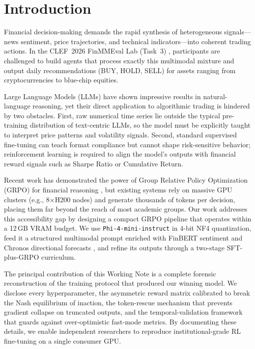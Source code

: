 \section{Introduction}
    Financial decision-making demands the rapid synthesis of heterogeneous signals---news sentiment, price trajectories, and technical indicators---into coherent trading actions. In the CLEF~2026 FinMMEval Lab (Task~3) \cite{theFinAI2025}, participants are challenged to build agents that process exactly this multimodal mixture and output daily recommendations (BUY, HOLD, SELL) for assets ranging from cryptocurrencies to blue-chip equities.

    Large Language Models (LLMs) have shown impressive results in natural-language reasoning, yet their direct application to algorithmic trading \cite{yang2023fingpt, zhang2023fingpt} is hindered by two obstacles. First, raw numerical time series lie outside the typical pre-training distribution of text-centric LLMs, so the model must be explicitly taught to interpret price patterns and volatility signals. Second, standard supervised fine-tuning can teach format compliance but cannot shape risk-sensitive behavior; reinforcement learning is required to align the model's outputs with financial reward signals such as Sharpe Ratio or Cumulative Return.

    Recent work has demonstrated the power of Group Relative Policy Optimization (GRPO) for financial reasoning \cite{xiao2025tradingr1}, but existing systems rely on massive GPU clusters (e.g., 8$\times$H200 nodes) and generate thousands of tokens per decision, placing them far beyond the reach of most academic groups. Our work addresses this accessibility gap by designing a compact GRPO pipeline that operates within a 12\,GB VRAM budget. We use \texttt{Phi-4-mini-instruct} in 4-bit NF4 quantization, feed it a structured multimodal prompt enriched with FinBERT sentiment \cite{araci2019finbert} and Chronos directional forecasts \cite{ansari2024chronos}, and refine its outputs through a two-stage SFT-plus-GRPO curriculum.

    The principal contribution of this Working Note is a complete forensic reconstruction of the training protocol that produced our winning model. We disclose every hyperparameter, the asymmetric reward matrix calibrated to break the Nash equilibrium of inaction, the token-rescue mechanism that prevents gradient collapse on truncated outputs, and the temporal-validation framework that guards against over-optimistic fast-mode metrics. By documenting these details, we enable independent researchers to reproduce institutional-grade RL fine-tuning on a single consumer GPU.

